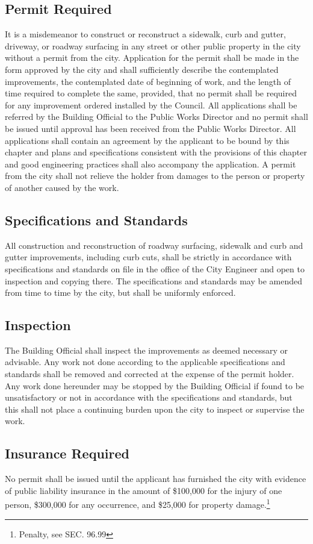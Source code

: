 \subsection{Permit Required}
It is a misdemeanor to construct or reconstruct a sidewalk, curb and gutter, driveway, or roadway surfacing in any street or other public property in the city without a permit from the city. Application for the permit shall be made in the form approved by the city and shall sufficiently describe the contemplated improvements, the contemplated date of beginning of work, and the length of time required to complete the same, provided, that no permit shall be required for any improvement ordered installed by the Council. All applications shall be referred by the Building Official to the Public Works Director and no permit shall be issued until approval has been received from the Public Works Director. All applications shall contain an agreement by the applicant to be bound by this chapter and plans and specifications consistent with the provisions of this chapter and good engineering practices shall also accompany the application. A permit from the city shall not relieve the holder from damages to the person or property of another caused by the work.
\subsection{Specifications and Standards}
All construction and reconstruction of roadway surfacing, sidewalk and curb and gutter improvements, including curb cuts, shall be strictly in accordance with specifications and standards on file in the office of the City Engineer and open to inspection and copying there.  The specifications and standards may be amended from time to time by the city, but shall be uniformly enforced.
\subsection{Inspection}
The Building Official shall inspect the improvements as deemed necessary or advisable.  Any work not done according to the applicable specifications and standards shall be removed and corrected at the expense of the permit holder.  Any work done hereunder may be stopped by the Building Official if found to be unsatisfactory or not in accordance with the specifications and standards, but this shall not place a continuing burden upon the city to inspect or supervise the work.
\subsection{Insurance Required}
No permit shall be issued until the applicant has furnished the city with evidence of public liability insurance in the amount of \$100,000 for the injury of one person, \$300,000 for any occurrence, and \$25,000 for property damage.\footnote{Penalty, see SEC. 96.99}

